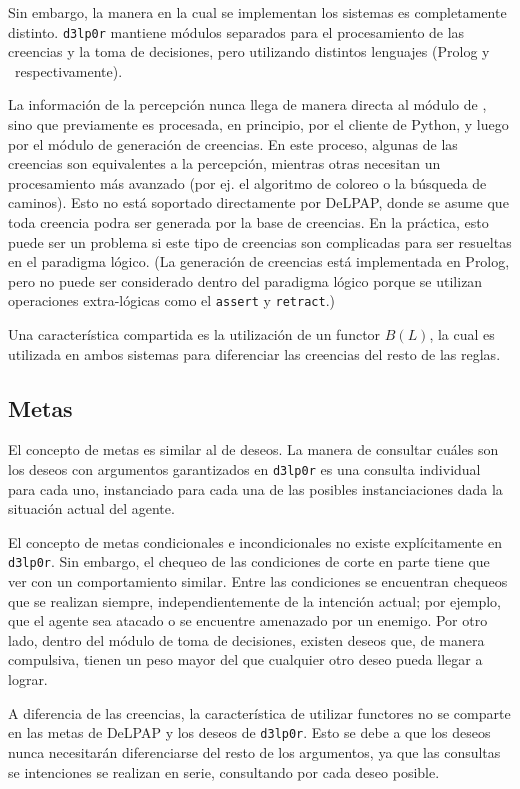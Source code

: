 Sin embargo, la manera en la cual se implementan los sistemas es completamente distinto. \texttt{d3lp0r} 
mantiene módulos separados para el procesamiento de las creencias y la toma de decisiones, pero 
utilizando distintos lenguajes (Prolog y \DLP\ respectivamente).

La información de la percepción nunca llega de manera directa al módulo de \DLP, sino que previamente 
es procesada, en principio, por el cliente de Python, y luego por el módulo de generación de 
creencias. En este proceso, algunas de las creencias son equivalentes a la percepción, mientras otras
necesitan un procesamiento más avanzado (por ej. el algoritmo de coloreo o la búsqueda de caminos).
Esto no está soportado directamente por DeLPAP, donde se asume que toda creencia podra ser generada
por la base de creencias. En la práctica, esto puede ser un problema si este tipo de creencias son 
complicadas para ser resueltas en el paradigma lógico. (La generación de creencias está implementada 
en Prolog, pero no puede ser considerado dentro del paradigma lógico porque se utilizan operaciones
extra-lógicas como el \texttt{assert} y \texttt{retract}.)

Una característica compartida es la utilización de un functor $B(L)$, la cual es utilizada en ambos
sistemas para diferenciar las creencias del resto de las reglas.

\subsection{Metas}

El concepto de metas es similar al de deseos. La manera de consultar cuáles son los deseos con 
argumentos garantizados en \texttt{d3lp0r} es una consulta individual para cada uno, instanciado para cada
una de las posibles instanciaciones dada la situación actual del agente.

El concepto de metas condicionales e incondicionales no existe explícitamente en \texttt{d3lp0r}. Sin embargo,
el chequeo de las condiciones de corte en parte tiene que ver con un comportamiento similar. Entre
las condiciones se encuentran chequeos que se realizan siempre, independientemente de la intención 
actual; por ejemplo, que el agente sea atacado o se encuentre amenazado por un enemigo. Por otro lado,
dentro del módulo de toma de decisiones, existen deseos que, de manera compulsiva, tienen un peso
mayor del que cualquier otro deseo pueda llegar a lograr. 

A diferencia de las creencias, la característica de utilizar functores no se comparte en las metas de
DeLPAP y los deseos de \texttt{d3lp0r}. Esto se debe a que los deseos nunca necesitarán diferenciarse del resto
de los argumentos, ya que las consultas se intenciones se realizan en serie, consultando por cada
deseo posible.

